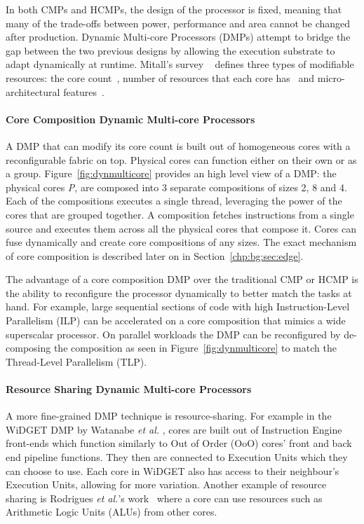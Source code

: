 In both CMPs and HCMPs, the design of the processor is fixed, meaning that many of the trade-offs between power, performance and area cannot be changed after production.
Dynamic Multi-core Processors (DMPs) attempt to bridge the gap between the two previous designs by allowing the execution substrate to adapt dynamically at runtime.
Mitall's survey ~\cite{MittalSurv2016} defines three types of modifiable resources: the core count~\cite{ipek2007CoreFusion,kim2007tflex,pricopi2012bahurupi}, number of resources that each core has~\cite{Homayoun3DPooling2012} and micro-architectural features~\cite{fallinhetblock2014,BauerRSE08,tavanaElastic}.

\paragraph*{Core Composition Dynamic Multi-core Processors}


A DMP that can modify its core count is built out of homogeneous cores with a reconfigurable fabric on top.
Physical cores can function either on their own or as a group.
Figure~\ref{fig:dynmulticore} provides an high level view of a DMP: the physical cores \textit{P}, are composed into 3 separate compositions of sizes 2, 8 and 4.
Each of the compositions executes a single thread, leveraging the power of the cores that are grouped together.
A composition fetches instructions from a single source and executes them across all the physical cores that compose it.
Cores can fuse dynamically and create core compositions of any sizes.
The exact mechanism of core composition is described later on in Section~\ref{chp:bg:sec:edge}.

The advantage of a core composition DMP over the traditional CMP or HCMP is the ability to reconfigure the processor dynamically to better match the tasks at hand.
For example, large sequential sections of code with high Instruction-Level Parallelism (ILP) can be accelerated on a core composition that mimics a wide superscalar processor.
On parallel workloads the DMP can be reconfigured by de-composing the composition as seen in Figure~\ref{fig:dynmulticore} to match the Thread-Level Parallelism (TLP).

\paragraph*{Resource Sharing Dynamic Multi-core Processors}
A more fine-grained DMP technique is resource-sharing.
For example in the WiDGET DMP by Watanabe {\it et al.} \cite{Watanabe2010Widget}, cores are built out of Instruction Engine front-ends which function similarly to Out of Order (OoO) cores' front and back end pipeline functions.
They then are connected to Execution Units which they can choose to use.
Each core in WiDGET also has access to their neighbour's Execution Units, allowing for more variation.
Another example of resource sharing is Rodrigues {\it et al.}'s work~\cite{rodrigues2014perf} where a core can use resources such as Arithmetic Logic Units (ALUs) from other cores.

